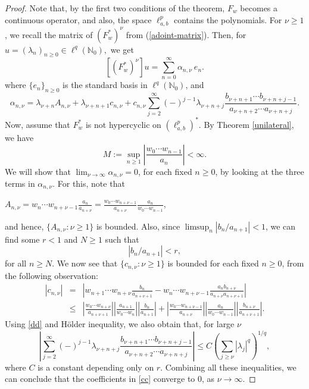 \documentclass[12pt, reqno]{amsart}
\theoremstyle{definition}
\theoremstyle{remark}
\numberwithin{equation}{section}
\begin{document}
\begin{proof}
Note that, by the first two conditions of the theorem, $F_w$ becomes a continuous operator, and also, the space $\ell^p_{a,b}$ contains the polynomials. For $\nu\geq 1$, we recall the matrix of $(F_{w}^{*})^{\nu}$ from (\ref{adoint-matrix}). Then, for $u=(\lambda_{n})_{n\geq 0}\in \ell^{q}(\mathbb{N}_{0}),$ we get
\begin{equation}\label{cc}
   [(F_{w}^{*})^{\nu}]u=\sum_{n=0}^{\infty} \alpha_{n,\nu} ~ e_{n}.
\end{equation}
where $\{e_{n}\}_{n\geq 0}$ is the standard basis in $\ell^q(\mathbb{N}_{0})$, and 
\[
\alpha_{n,\nu}= \lambda_{\nu+n} A_{n,\nu} +\lambda_{\nu+n+1}c_{n,\nu}+c_{n,\nu}\displaystyle{\sum_{j=2}^{\infty}(-)^{j-1}\lambda_{\nu+n+j}\frac{b_{\nu+n+1}\cdots b_{\nu+n+j-1}}{a_{\nu+n+2}\cdots a_{\nu+n+j}}}.
\]
Now, assume that $F_{w}^{*}$ is not hypercyclic on $(\ell^p_{a,b})^*$. By Theorem \ref{unilateral}, we have 
\[
M:=\sup_{n\geq 1}\left|\frac{w_{0}\cdots w_{n-1}}{a_{n}}\right|<\infty.
\]
We will show that $\lim_{\nu \rightarrow \infty}\alpha_{n,\nu}=0$, for each fixed $n\geq 0$, by looking at the three terms in $\alpha_{n,\nu}$. For this, note that 
\begin{center}
$A_{n,\nu}=w_{n}\cdots w_{n+\nu-1}\frac{a_{n}}{a_{n+\nu}}=\frac{w_{0} \cdots w_{n+\nu-1}}{a_{n+\nu}}\frac{a_{n}}{w_{0}\cdots w_{n-1}}$, 
\end{center}
and hence, $\{A_{n,\nu}:\nu\geq 1\}$ is bounded. Also, since $\limsup_n |b_n/a_{n+1}|<1$, we can find some $r<1$ and $N\geq 1$ such that 
\begin{equation}\label{dd}
|b_n/a_{n+1}|<r,
\end{equation}
for all $n\geq N$. We now see that $\{c_{n,\nu}:\nu\geq 1\}$ is bounded for each fixed $n\geq 0$, from the following observation:
\begin{eqnarray*}
   |c_{n,\nu}|&=&\left|w_{n+1}\cdots w_{n+\nu}\frac{b_{n}}{a_{n+\nu+1}}-w_{n}\cdots w_{n+\nu-1}\frac{a_{n}b_{n+\nu}}{a_{n+\nu}a_{n+\nu+1}}\right| \\
   &\leq& \left|\frac{w_{0}\cdots w_{n+\nu}}{a_{n+\nu+1}}\right|\left|\frac{a_{n+1}}{w_{0}\cdots w_{n}}\right|\left|\frac{b_{n}}{a_{n+1}}\right|+\left|\frac{w_{0}\cdots w_{n+\nu-1}}{a_{n+\nu}}\right|\left|\frac{a_{n}}{w_{0}\cdots w_{n-1}}\right|\left|\frac{b_{n+\nu}}{a_{n+\nu+1}}\right|.
\end{eqnarray*}
Using \eqref{dd} and H\"{o}lder inequality, we also obtain that, for large $\nu$
\[
\left|\sum_{j=2}^{\infty}(-)^{j-1}\lambda_{\nu+n+j}\frac{b_{\nu+n+1}\cdots b_{\nu+n+j-1}}{a_{\nu+n+2}\cdots a_{\nu+n+j}}\right|\leq C \left(\sum_{j\geq \nu}|\lambda_j|^q\right)^{1/q},
\]
where $C$ is a constant depending only on $r$. Combining all these inequalities, we can conclude that the coefficients in \eqref{cc} converge to $0$, as $\nu\rightarrow \infty$.
\end{proof} 
\end{document}
